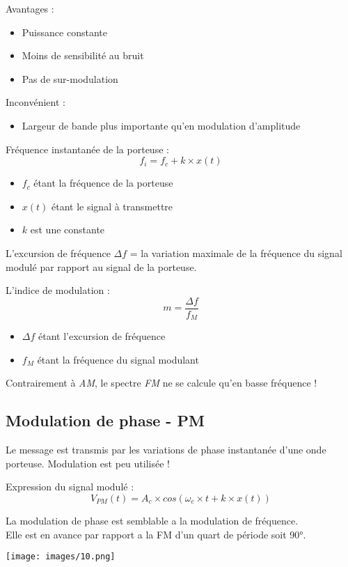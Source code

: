 \documentclass[a4paper]{article}
\begin{document}
Avantages :
\begin{itemize}
    \item Puissance constante
    \item Moins de sensibilité au bruit
    \item Pas de sur-modulation
\end{itemize}

Inconvénient :
\begin{itemize}
    \item Largeur de bande plus importante qu'en modulation d'amplitude
\end{itemize}
Fréquence instantanée de la porteuse :
$$ f_i = f_c + k \times x(t) $$
\begin{itemize}
    \item $f_c$ étant la fréquence de la porteuse
    \item $x(t)$ étant le signal à transmettre
    \item $k$ est une constante
\end{itemize}

L'excursion de fréquence $\Delta f$ = la variation maximale de la fréquence du signal modulé par rapport au signal de la porteuse.

L'indice de modulation : 
$$ m = \frac{\Delta f}{f_M} $$
\begin{itemize}
    \item $\Delta f$ étant l'excursion de fréquence
    \item $f_M$ étant la fréquence du signal modulant
\end{itemize}

Contrairement à \emph{AM}, le spectre \emph{FM} ne se calcule qu'en basse fréquence !

\subsection{Modulation de phase - PM}
Le message est transmis par les variations de phase instantanée d'une onde porteuse.
Modulation est peu utilisée !

Expression du signal modulé :
$$ V_{PM}(t) = A_c \times cos(\omega_c \times t + k \times x(t))$$

La modulation de phase est semblable a la modulation de fréquence.\\ Elle est en avance par rapport a la FM d'un quart de période soit 90°.
\begin{center}
    \texttt{[image: images/10.png]}
\end{center}
\end{document}
